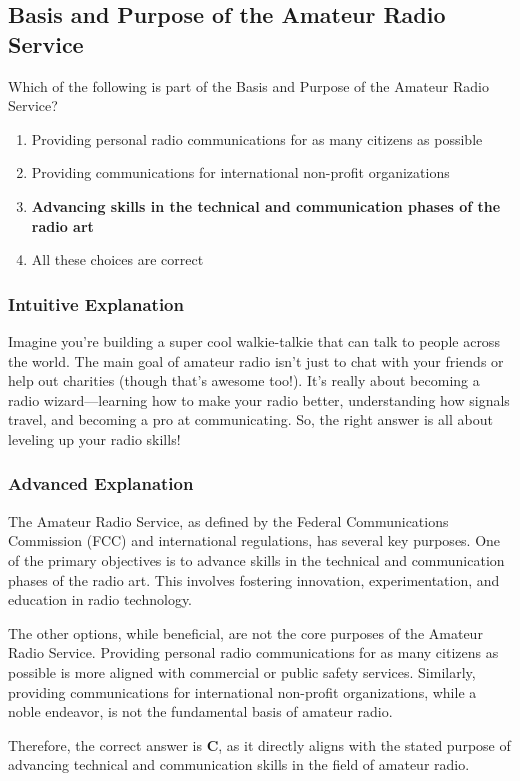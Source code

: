 \subsection{Basis and Purpose of the Amateur Radio Service}
\label{T1A01}

\begin{tcolorbox}[colback=gray!10!white,colframe=black!75!black,title=T1A01]
Which of the following is part of the Basis and Purpose of the Amateur Radio Service?
\begin{enumerate}[label=\Alph*)]
    \item Providing personal radio communications for as many citizens as possible
    \item Providing communications for international non-profit organizations
    \item \textbf{Advancing skills in the technical and communication phases of the radio art}
    \item All these choices are correct
\end{enumerate}
\end{tcolorbox}

\subsubsection{Intuitive Explanation}
Imagine you’re building a super cool walkie-talkie that can talk to people across the world. The main goal of amateur radio isn’t just to chat with your friends or help out charities (though that’s awesome too!). It’s really about becoming a radio wizard—learning how to make your radio better, understanding how signals travel, and becoming a pro at communicating. So, the right answer is all about leveling up your radio skills!

\subsubsection{Advanced Explanation}
The Amateur Radio Service, as defined by the Federal Communications Commission (FCC) and international regulations, has several key purposes. One of the primary objectives is to advance skills in the technical and communication phases of the radio art. This involves fostering innovation, experimentation, and education in radio technology. 

The other options, while beneficial, are not the core purposes of the Amateur Radio Service. Providing personal radio communications for as many citizens as possible is more aligned with commercial or public safety services. Similarly, providing communications for international non-profit organizations, while a noble endeavor, is not the fundamental basis of amateur radio. 

Therefore, the correct answer is \textbf{C}, as it directly aligns with the stated purpose of advancing technical and communication skills in the field of amateur radio.

